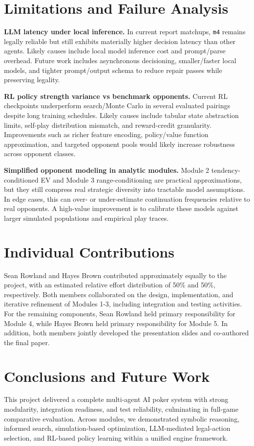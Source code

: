 \documentclass[11pt]{article}
\begin{document}
\section{Limitations and Failure Analysis}
\textbf{LLM latency under local inference.} In current report matchups, \texttt{m4} remains legally reliable but still exhibits materially higher decision latency than other agents. Likely causes include local model inference cost and prompt/parse overhead. Future work includes asynchronous decisioning, smaller/faster local models, and tighter prompt/output schema to reduce repair passes while preserving legality.

\textbf{RL policy strength variance vs benchmark opponents.} Current RL checkpoints underperform search/Monte Carlo in several evaluated pairings despite long training schedules. Likely causes include tabular state abstraction limits, self-play distribution mismatch, and reward-credit granularity. Improvements such as richer feature encoding, policy/value function approximation, and targeted opponent pools would likely increase robustness across opponent classes.

\textbf{Simplified opponent modeling in analytic modules.} Module 2 tendency-conditioned EV and Module 3 range-conditioning are practical approximations, but they still compress real strategic diversity into tractable model assumptions. In edge cases, this can over- or under-estimate continuation frequencies relative to real opponents. A high-value improvement is to calibrate these models against larger simulated populations and empirical play traces.


\section{Individual Contributions}
Sean Rowland and Hayes Brown contributed approximately equally to the project, with an estimated relative effort distribution of 50\% and 50\%, respectively.
Both members collaborated on the design, implementation, and iterative refinement of Modules 1-3, including integration and testing activities.
For the remaining components, Sean Rowland held primary responsibility for Module 4, while Hayes Brown held primary responsibility for Module 5.
In addition, both members jointly developed the presentation slides and co-authored the final paper.

\section{Conclusions and Future Work}
This project delivered a complete multi-agent AI poker system with strong modularity, integration readiness, and test reliability, culminating in full-game comparative evaluation. Across modules, we demonstrated symbolic reasoning, informed search, simulation-based optimization, LLM-mediated legal-action selection, and RL-based policy learning within a unified engine framework.
\end{document}
